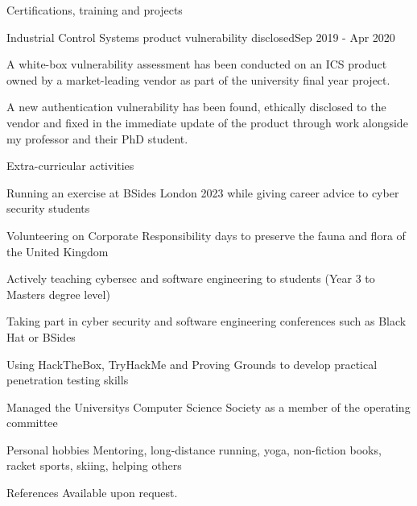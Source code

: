 \documentclass{resume} %
\begin{document}
\begin{rSection}{Certifications, training and projects}
\begin{rSubsection}{Industrial Control Systems product vulnerability disclosed}{Sep 2019 - Apr 2020}{}{}
\item A white-box vulnerability assessment has been conducted on an ICS product owned by a market-leading vendor as part of the university final year project. 

\item A new authentication vulnerability has been found, ethically disclosed to the vendor and fixed in the immediate update of the product through work alongside my professor and their PhD student. 
\end{rSubsection}


\end{rSection}


\begin{rSection}{Extra-curricular activities}
\item Running an exercise at BSides London 2023 while giving career advice to cyber security students
\item Volunteering on Corporate Responsibility days to preserve the fauna and flora of the United Kingdom 
\item Actively teaching cybersec and software engineering to students (Year 3 to Masters degree level)
\item Taking part in cyber security and software engineering conferences such as Black Hat or BSides
\item Using HackTheBox, TryHackMe and Proving Grounds to develop practical penetration testing skills
\item Managed the University\textsc{}s Computer Science Society as a member of the operating committee\\

\end{rSection}

\begin{rSection}{Personal hobbies}
Mentoring, long-distance running, yoga, non-fiction books, racket sports, skiing, helping others\\
\end{rSection}

\begin{rSection}{References}
Available upon request.
\end{rSection}
\end{document}
